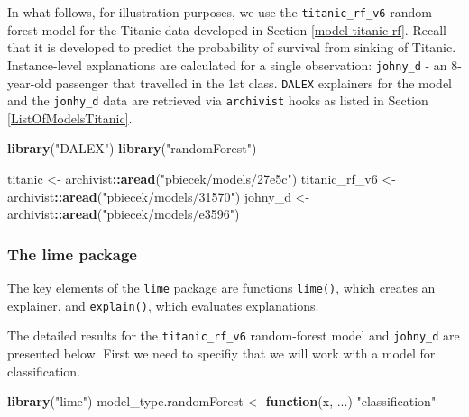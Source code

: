 \documentclass[12pt,]{krantz}
\newenvironment{Shaded}{\begin{snugshade}}{\end{snugshade}}
\newcommand{\ControlFlowTok}[1]{\textcolor[rgb]{0.13,0.29,0.53}{\textbf{#1}}}
\newcommand{\KeywordTok}[1]{\textcolor[rgb]{0.13,0.29,0.53}{\textbf{#1}}}
\newcommand{\NormalTok}[1]{#1}
\newcommand{\OperatorTok}[1]{\textcolor[rgb]{0.81,0.36,0.00}{\textbf{#1}}}
\newcommand{\StringTok}[1]{\textcolor[rgb]{0.31,0.60,0.02}{#1}}
\begin{document}
In what follows, for illustration purposes, we use the \texttt{titanic\_rf\_v6} random-forest model for the Titanic data developed in Section \ref{model-titanic-rf}. Recall that it is developed to predict the probability of survival from sinking of Titanic. Instance-level explanations are calculated for a single observation: \texttt{johny\_d} - an 8-year-old passenger that travelled in the 1st class. \texttt{DALEX} explainers for the model and the \texttt{jonhy\_d} data are retrieved via \texttt{archivist} hooks as listed in Section \ref{ListOfModelsTitanic}.

\begin{Shaded}
\begin{Highlighting}[]
\KeywordTok{library}\NormalTok{(}\StringTok{"DALEX"}\NormalTok{)}
\KeywordTok{library}\NormalTok{(}\StringTok{"randomForest"}\NormalTok{)}

\NormalTok{titanic <-}\StringTok{ }\NormalTok{archivist}\OperatorTok{::}\KeywordTok{aread}\NormalTok{(}\StringTok{"pbiecek/models/27e5c"}\NormalTok{)}
\NormalTok{titanic_rf_v6 <-}\StringTok{ }\NormalTok{archivist}\OperatorTok{::}\KeywordTok{aread}\NormalTok{(}\StringTok{"pbiecek/models/31570"}\NormalTok{)}
\NormalTok{johny_d <-}\StringTok{ }\NormalTok{archivist}\OperatorTok{::}\KeywordTok{aread}\NormalTok{(}\StringTok{"pbiecek/models/e3596"}\NormalTok{)}
\end{Highlighting}
\end{Shaded}

\hypertarget{the-lime-package}{%
\subsubsection{The lime package}\label{the-lime-package}}

The key elements of the \texttt{lime} package are functions \texttt{lime()}, which creates an explainer, and \texttt{explain()}, which evaluates explanations.

The detailed results for the \texttt{titanic\_rf\_v6} random-forest model and \texttt{johny\_d} are presented below. First we need to specifiy that we will work with a model for classification.

\begin{Shaded}
\begin{Highlighting}[]
\KeywordTok{library}\NormalTok{(}\StringTok{"lime"}\NormalTok{)}
\NormalTok{model_type.randomForest <-}\StringTok{ }\ControlFlowTok{function}\NormalTok{(x, ...) }\StringTok{"classification"}
\end{Highlighting}
\end{Shaded}
\end{document}

